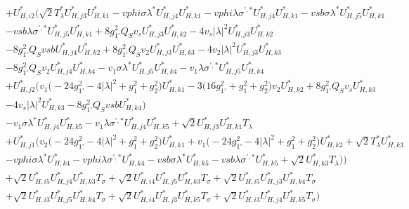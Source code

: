 \begin{align}
 &+U^*_{{H},{i 2}} \Big(\sqrt{2} T_{\lambda}^* U^*_{{H},{j 3}} U^*_{{H},{k 1}} - vphi \sigma \lambda^* U^*_{{H},{j 4}} U^*_{{H},{k 1}} - vphi \lambda \sigma^{\prime,*} U^*_{{H},{j 4}} U^*_{{H},{k 1}} - vsb \sigma \lambda^* U^*_{{H},{j 5}} U^*_{{H},{k 1}} \nonumber \\ 
 &- vsb \lambda \sigma^{\prime,*} U^*_{{H},{j 5}} U^*_{{H},{k 1}} +8 g_{1'}^{2} Q_{S} v_s U^*_{{H},{j 3}} U^*_{{H},{k 2}} -4 v_s |\lambda|^2 U^*_{{H},{j 3}} U^*_{{H},{k 2}} \nonumber \\ 
 &-8 g_{1'}^{2} Q_{S} vsb U^*_{{H},{j 4}} U^*_{{H},{k 2}} +8 g_{1'}^{2} Q_{S} v_2 U^*_{{H},{j 3}} U^*_{{H},{k 3}} -4 v_2 |\lambda|^2 U^*_{{H},{j 3}} U^*_{{H},{k 3}} \nonumber \\ 
 &-8 g_{1'}^{2} Q_{S} v_2 U^*_{{H},{j 4}} U^*_{{H},{k 4}} - v_1 \sigma \lambda^* U^*_{{H},{j 5}} U^*_{{H},{k 4}} - v_1 \lambda \sigma^{\prime,*} U^*_{{H},{j 5}} U^*_{{H},{k 4}} \nonumber \\ 
 &+U^*_{{H},{j 2}} \Big(v_1 \Big(-24 g_{1'}^{2}  -4 |\lambda|^2  + g_{1}^{2} + g_{2}^{2}\Big)U^*_{{H},{k 1}} -3 \Big(16 g_{1'}^{2}  + g_{1}^{2} + g_{2}^{2}\Big)v_2 U^*_{{H},{k 2}} +8 g_{1'}^{2} Q_{S} v_s U^*_{{H},{k 3}} \nonumber \\ 
 &-4 v_s |\lambda|^2 U^*_{{H},{k 3}} -8 g_{1'}^{2} Q_{S} vsb U^*_{{H},{k 4}} \Big)\nonumber \\ 
 &- v_1 \sigma \lambda^* U^*_{{H},{j 4}} U^*_{{H},{k 5}} - v_1 \lambda \sigma^{\prime,*} U^*_{{H},{j 4}} U^*_{{H},{k 5}} +\sqrt{2} U^*_{{H},{j 3}} U^*_{{H},{k 1}} T_{\lambda} \nonumber \\ 
 &+U^*_{{H},{j 1}} \Big(v_2 \Big(-24 g_{1'}^{2}  -4 |\lambda|^2  + g_{1}^{2} + g_{2}^{2}\Big)U^*_{{H},{k 1}} +v_1 \Big(-24 g_{1'}^{2}  -4 |\lambda|^2  + g_{1}^{2} + g_{2}^{2}\Big)U^*_{{H},{k 2}} +\sqrt{2} T_{\lambda}^* U^*_{{H},{k 3}} \nonumber \\ 
 &- vphi \sigma \lambda^* U^*_{{H},{k 4}} - vphi \lambda \sigma^{\prime,*} U^*_{{H},{k 4}} - vsb \sigma \lambda^* U^*_{{H},{k 5}} - vsb \lambda \sigma^{\prime,*} U^*_{{H},{k 5}} +\sqrt{2} U^*_{{H},{k 3}} T_{\lambda} \Big)\Big)\nonumber \\ 
 &+\sqrt{2} U^*_{{H},{i 5}} U^*_{{H},{j 4}} U^*_{{H},{k 3}} T_{\sigma} +\sqrt{2} U^*_{{H},{i 4}} U^*_{{H},{j 5}} U^*_{{H},{k 3}} T_{\sigma} +\sqrt{2} U^*_{{H},{i 5}} U^*_{{H},{j 3}} U^*_{{H},{k 4}} T_{\sigma} \nonumber \\ 
 &+\sqrt{2} U^*_{{H},{i 3}} U^*_{{H},{j 5}} U^*_{{H},{k 4}} T_{\sigma} +\sqrt{2} U^*_{{H},{i 4}} U^*_{{H},{j 3}} U^*_{{H},{k 5}} T_{\sigma} +\sqrt{2} U^*_{{H},{i 3}} U^*_{{H},{j 4}} U^*_{{H},{k 5}} T_{\sigma} \Big)\end{align} 
